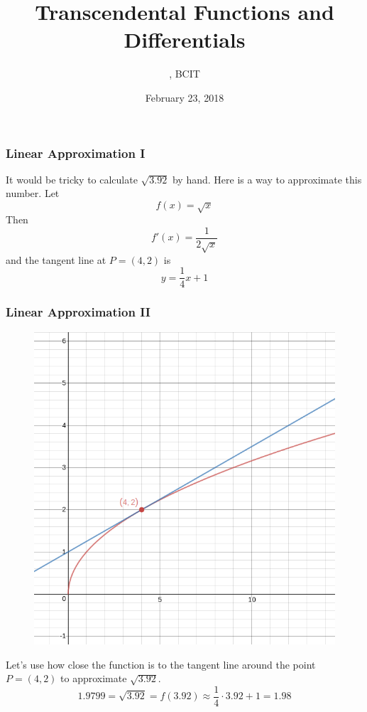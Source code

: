 \documentclass[xcolor=dvipsnames]{beamer}
\title{Transcendental Functions and Differentials}
\subtitle{{\CourseNumber}, BCIT}
\author{\CourseName}
\date{February 23, 2018}
\begin{document}
\begin{frame}
  \titlepage
\end{frame}

\begin{frame}
  \frametitle{Linear Approximation I}
It would be tricky to calculate $\sqrt{3.92}$ by hand. Here is a way
to approximate this number. Let
\begin{equation}
  \label{eq:eiyahqui}
  f(x)=\sqrt{x}
\end{equation}
Then 
\begin{equation}
  \label{eq:geimaimo}
  f'(x)=\frac{1}{2\sqrt{x}}
\end{equation}
and the tangent line at $P=(4,2)$ is
\begin{equation}
  \label{eq:oocahpoh}
y=\frac{1}{4}x+1  
\end{equation}
\end{frame}

\begin{frame}
  \frametitle{Linear Approximation II}
\begin{figure}[h]
\includegraphics[scale=.25]{./diagrams/linapp1.png}
\end{figure}
Let's use how close the function is to the tangent line around the point $P=(4,2)$ to approximate $\sqrt{3.92}$.
\begin{equation}
  \label{eq:chairaey}
  1.9799=\sqrt{3.92}=f(3.92)\approx{}\frac{1}{4}\cdot{}3.92+1=1.98
\end{equation}
\end{frame}
\end{document}
